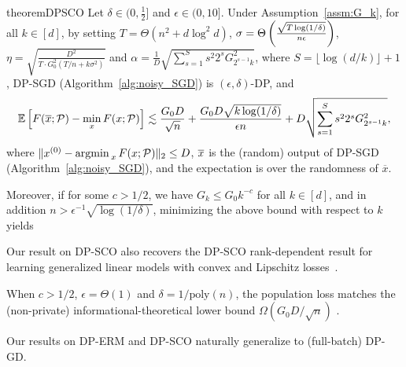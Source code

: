 \begin{restatable}{theorem}{DPSCO}
\label{thm:DPSCO}
Let $ \delta \in (0, \frac{1}{2}]$ and $\epsilon\in (0,10]$.
Under Assumption~\ref{assm:G_k}, for all $k \in [d]$, 
by setting
$T=\Theta(n^2 + d \log^2 d)$,
$\sigma=\Theta \left( \frac{\sqrt{T\log(1/\delta)}}{n\epsilon} \right)$, 
$\eta=\sqrt{\frac{D^{2}}{T\cdot G_{0}^{2}(T/n+k\sigma^{2})}}$
and $\alpha=\frac{1}{D}\sqrt{\sum_{s=1}^S s^2 2^{s}G_{2^{s-1}k}^{2}}$, where $S = \lfloor \log(d/k) \rfloor + 1$, 
DP-SGD (Algorithm~\ref{alg:noisy_SGD}) is $(\epsilon,\delta)$-DP, and
\begin{align*}
\mathbb{E} \left[
    F(\overline{x}; \mathcal P) - \min_{x} F(x; \mathcal P)
\right]
\lesssim
    \frac{G_0D}{\sqrt{n}}+\frac{G_{0}D\sqrt{k\log(1/\delta)}}{\epsilon n}+D\sqrt{\sum_{s=1}^{S}s^2 2^{s}G_{2^{s-1}k}^{2}},
\end{align*}
where $\|x^{(0)}- \mathop{\mathrm{argmin\,}}_x F(x ; \mathcal P) \|_2 \le D$, $\overline{x}$ is the (random) output of DP-SGD (Algorithm~\ref{alg:noisy_SGD}), and the expectation is over the randomness of $\overline{x}$.

Moreover, if for some $c>1/2$, we have $G_k\leq G_0 k^{-c}$ for all $k \in [d]$, and in addition $n>\epsilon^{-1}\sqrt{\log(1/\delta)}$, minimizing the above bound with respect to $k$ yields
\end{restatable}

\begin{remark}
Our result on DP-SCO also recovers the DP-SCO rank-dependent result for learning generalized linear models with convex and Lipschitz losses~\cite{song2021evading}.
\end{remark}

\begin{remark}
When $c>1/2$, $\epsilon = \Theta(1)$ and $\delta = 1/\mathrm{poly}(n)$, the population loss matches the (non-private) informational-theoretical lower bound $\Omega(G_0 D/\sqrt{n})$ \cite{agarwal2009information}.
\end{remark}

\begin{remark}
    Our results on DP-ERM and DP-SCO naturally generalize to (full-batch) DP-GD.
\end{remark}

